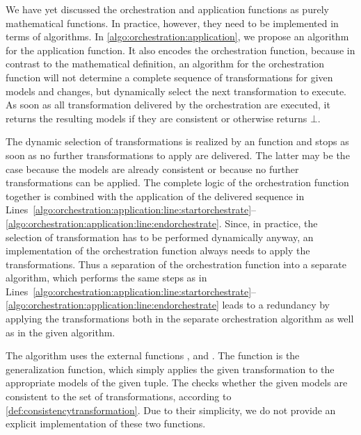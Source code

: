 We have yet discussed the orchestration and application functions as purely mathematical functions.
In practice, however, they need to be implemented in terms of algorithms.
In \autoref{algo:orchestration:application}, we propose an algorithm for the application function.
It also encodes the orchestration function, because in contrast to the mathematical definition, an algorithm for the orchestration function will not determine a complete sequence of transformations for given models and changes, but dynamically select the next transformation to execute.
As soon as all transformation delivered by the orchestration are executed, it returns the resulting models if they are consistent or otherwise returns $\bot$.

The dynamic selection of transformations is realized by an  function and stops as soon as no further transformations to apply are delivered.
The latter may be the case because the models are already consistent or because no further transformations can be applied.
The complete logic of the orchestration function together is combined with the application of the delivered sequence in Lines~\ref{algo:orchestration:application:line:startorchestrate}--\ref{algo:orchestration:application:line:endorchestrate}.
Since, in practice, the selection of transformation has to be performed dynamically anyway, an implementation of the orchestration function always needs to apply the transformations.
Thus a separation of the orchestration function into a separate algorithm, which performs the same steps as in Lines~\ref{algo:orchestration:application:line:startorchestrate}--\ref{algo:orchestration:application:line:endorchestrate} leads to a redundancy by applying the transformations both in the separate orchestration algorithm as well as in the given algorithm.

The algorithm uses the external functions ,  and .
The  function is the generalization function, which simply applies the given transformation to the appropriate models of the given tuple.
The  checks whether the given models are consistent to the set of transformations, according to \autoref{def:consistencytransformation}.
Due to their simplicity, we do not provide an explicit implementation of these two functions.

